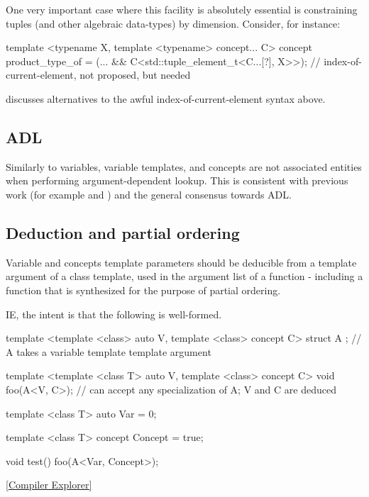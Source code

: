 \documentclass{wg21}
\begin{document}
One very important case where this facility is absolutely essential is constraining tuples (and other algebraic data-types) by dimension. Consider, for instance:

\begin{colorblock}
template <typename X, template <typename> concept... C>
concept product_type_of = (... && C<std::tuple_element_t<C...[?], X>>);
//   index-of-current-element, not proposed, but needed  ~~~~~~~
\end{colorblock}

 discusses alternatives to the awful index-of-current-element syntax above.

\subsection{ADL}

Similarly to variables, variable templates, and concepts are not associated entities when performing argument-dependent lookup.
This is consistent with previous work (for example  and ) and the general consensus towards ADL.

\subsection{Deduction and partial ordering}

Variable and concepts template parameters should be deducible from a template argument of a class template, used in the argument list of a function
- including a function that is synthesized for the purpose of partial ordering.

IE, the intent is that the following is well-formed.

\begin{colorblock}
template <template <class> auto V, template <class> concept C>
struct A {}; // A takes a variable template template argument

template <template <class T> auto V, template <class> concept C>
void foo(A<V, C>);  // can accept any specialization of A; V and C are deduced

template <class T>
auto Var = 0;

template <class T>
concept Concept = true;

void test() {
    foo(A<Var, Concept>{});
}
\end{colorblock}

\href{https://compiler-explorer.com/z/66dr6fnKj}{[Compiler Explorer]}
\end{document}
